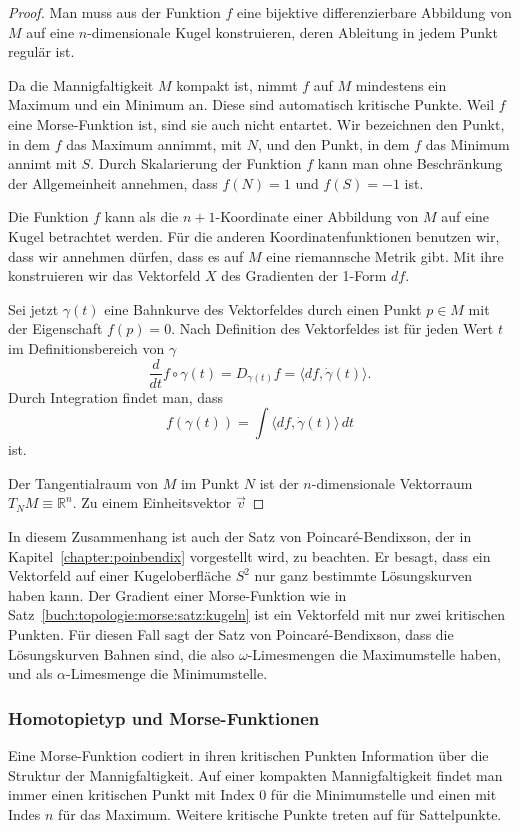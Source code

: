\begin{proof}
%
Man muss aus der Funktion $f$ eine bijektive differenzierbare Abbildung
von $M$ auf eine $n$-dimensionale Kugel konstruieren, deren Ableitung
in jedem Punkt regulär ist.

Da die Mannigfaltigkeit $M$ kompakt ist, nimmt $f$ auf $M$ mindestens
ein Maximum und ein Minimum an.
Diese sind automatisch kritische Punkte.
Weil $f$ eine Morse-Funktion ist, sind sie auch nicht entartet.
Wir bezeichnen den Punkt, in dem $f$ das Maximum annimmt, mit $N$,
und den Punkt, in dem $f$ das Minimum annimt mit $S$.
Durch Skalarierung der Funktion $f$ kann man ohne Beschränkung der
Allgemeinheit annehmen, dass $f(N)=1$ und $f(S) = -1$ ist.

Die Funktion $f$ kann als die $n+1$-Koordinate einer Abbildung von $M$ 
auf eine Kugel betrachtet werden.
Für die anderen Koordinatenfunktionen benutzen wir, dass wir annehmen
dürfen, dass es auf $M$ eine riemannsche Metrik gibt.
Mit ihre konstruieren wir das Vektorfeld $X$ des Gradienten der 1-Form $df$.

Sei jetzt $\gamma(t)$ eine Bahnkurve des Vektorfeldes durch einen Punkt
$p\in M$ mit der Eigenschaft $f(p)=0$.
Nach Definition des Vektorfeldes ist für jeden Wert $t$ im Definitionsbereich
von $\gamma$
\[
\frac{d}{dt}f\circ\gamma(t)
=
D_{\dot{\gamma}(t)} f
=
\langle df, \dot{\gamma}(t) \rangle.
\]
Durch Integration findet man, dass
\[
f(\gamma(t))
=
\int \langle df,\dot{\gamma}(t)\rangle \,dt
\]
ist.



Der Tangentialraum von $M$ im Punkt $N$ ist der
$n$-dimensionale Vektorraum $T_NM\equiv \mathbb{R}^n$.
Zu einem Einheitsvektor $\vec{v}$ 

\end{proof}

In diesem Zusammenhang ist auch der Satz von Poincaré-Bendixson,
der in Kapitel~\ref{chapter:poinbendix} vorgestellt wird, zu beachten.
Er besagt, dass ein Vektorfeld auf einer Kugeloberfläche $S^2$ nur
ganz bestimmte Lösungskurven haben kann.
Der Gradient einer Morse-Funktion wie in
Satz~\ref{buch:topologie:morse:satz:kugeln}
ist ein Vektorfeld mit nur zwei kritischen Punkten.
Für diesen Fall sagt der Satz von Poincaré-Bendixson, dass die
Lösungskurven Bahnen sind, die also $\omega$-Limesmengen die 
Maximumstelle haben, und als $\alpha$-Limesmenge die Minimumstelle.

%
%
\subsubsection{Homotopietyp und Morse-Funktionen}
Eine Morse-Funktion codiert in ihren kritischen Punkten Information
über die Struktur der Mannigfaltigkeit.
Auf einer kompakten Mannigfaltigkeit findet man immer einen kritischen
Punkt mit Index $0$ für die Minimumstelle und einen mit Indes $n$ für
das Maximum.
Weitere kritische Punkte treten auf für Sattelpunkte.

